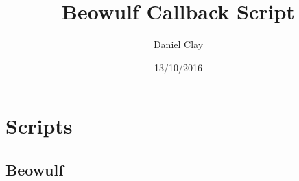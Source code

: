 \documentclass[a4paper]{article}
\begin{document}
\title{Beowulf Callback Script}
\date{13/10/2016}
\author{
Daniel Clay \\ 
}
\maketitle

\section{Scripts}

\subsection{Beowulf}%
\end{document}
